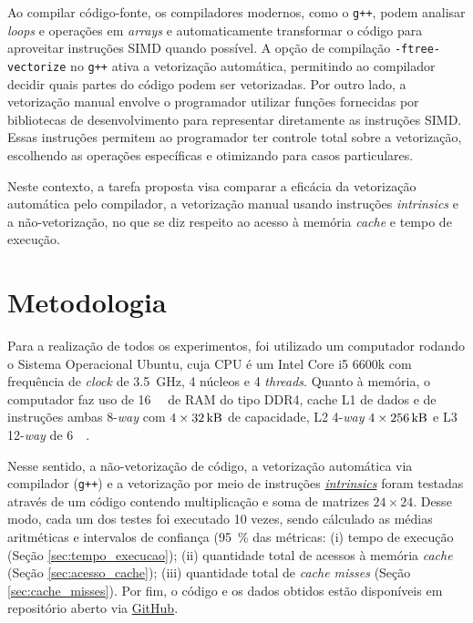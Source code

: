 \documentclass[12pt,a4paper]{article}
\begin{document}
Ao compilar código-fonte, os compiladores modernos, como o \texttt{g++}, podem analisar \textit{loops} e operações em \textit{arrays} e automaticamente transformar o código para aproveitar instruções SIMD quando possível. A opção de compilação \texttt{-ftree-vectorize} no \texttt{g++} ativa a vetorização automática, permitindo ao compilador decidir quais partes do código podem ser vetorizadas. Por outro lado, a vetorização manual envolve o programador utilizar funções fornecidas por bibliotecas de desenvolvimento para representar diretamente as instruções SIMD. Essas instruções permitem ao programador ter controle total sobre a vetorização, escolhendo as operações específicas e otimizando para casos particulares.

Neste contexto, a tarefa proposta visa comparar a eficácia da vetorização automática pelo compilador, a vetorização manual usando instruções \textit{intrinsics} e a não-vetorização, no que se diz respeito ao acesso à memória \textit{cache} e tempo de execução.

\section{Metodologia}

Para a realização de todos os experimentos, foi utilizado um computador rodando o Sistema Operacional Ubuntu, cuja CPU é um Intel Core i5 6600k com frequência de \textit{clock} de \SI{3,5}{\giga\hertz}, 4 núcleos e 4 \textit{threads}. Quanto à memória, o computador faz uso de \SI{16}{\giga\byte} de RAM do tipo DDR4, cache L1 de dados e de instruções ambas 8-\textit{way} com $4 \times \SI{32}{\kilo\byte}$ de capacidade, L2 4-\textit{way} $4 \times \SI{256}{\kilo\byte}$ e L3 12-\textit{way} de \SI{6}{\mega\byte}.

Nesse sentido, a não-vetorização de código, a vetorização automática via compilador (\texttt{g++}) e a vetorização por meio de instruções \href{https://www.intel.com/content/www/us/en/docs/intrinsics-guide/index.html#}{\textit{intrinsics}} foram testadas através de um código contendo multiplicação e soma de matrizes $24 \times 24$. Desse modo, cada um dos testes foi executado 10 vezes, sendo cálculado as médias aritméticas e intervalos de confiança (\SI{95}{\percent} das métricas: (i) tempo de execução (Seção \ref{sec:tempo_execucao}); (ii) quantidade total de acessos à memória \textit{cache} (Seção \ref{sec:acesso_cache}); (iii) quantidade total de \textit{cache misses} (Seção \ref{sec:cache_misses}). Por fim, o código e os dados obtidos estão disponíveis em repositório aberto via \href{https://github.com/greffao/Optimizing-Code}{GitHub}.  
\end{document}

